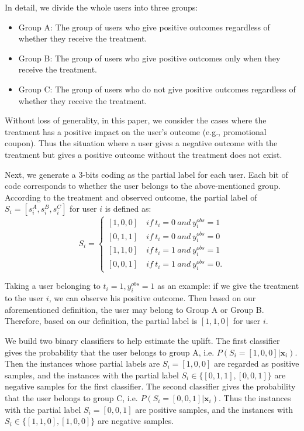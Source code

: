 In detail, we divide the whole users into three groups:
\begin{itemize}
	\item Group A: The group of users who give positive outcomes regardless of whether they receive the treatment.
	\item Group B: The group of users who give positive outcomes only when they receive the treatment.
	\item Group C: The group of users who do not give positive outcomes regardless of whether they receive the treatment.
\end{itemize}
Without loss of generality, in this paper, we consider the cases where the treatment has a positive impact on the user's outcome (e.g., promotional coupon). Thus the situation where a user gives a negative outcome with the treatment but gives a positive outcome without the treatment does not exist. 

Next, we generate a 3-bits coding as the partial label for each user. Each bit of code corresponds to whether the user belongs to the above-mentioned group. 
According to the treatment and observed outcome, the partial label of $S_i = [s_{i}^A, s_{i}^B, s_{i}^C]$ for user $i$ is defined as:
\begin{equation}
S_i =
\begin{cases}
[1, 0, 0]& \: if \: t_i=0 \: and \: y_i^{obs}=1\\
[0, 1, 1]& \: if \: t_i=0 \: and \: y_i^{obs}=0\\
[1, 1, 0]& \: if \: t_i=1\: and \: y_i^{obs}=1\\
[0, 0, 1]& \: if \: t_i=1\: and \: y_i^{obs}=0.
\end{cases}
\end{equation}

Taking a user belonging to $t_i=1, y_i^{obs}=1$ as an example: if we give the treatment to the user $i$, we can observe his positive outcome. Then based on our aforementioned definition, the user may belong to Group A or Group B. Therefore, based on our definition, the partial label is $[1, 1, 0]$ for user $i$. 

We build two binary classifiers to help estimate the uplift. The first classifier gives the probability that the user belongs to group A, i.e. $P(S_i=[1, 0, 0]|\mathbf{x}_i)$. Then the instances whose partial labels are $S_i = [1, 0, 0]$ are regarded as positive samples, and the instances with the partial label $S_i \in \{[0, 1, 1], [0, 0, 1]\}$ are negative samples for the first classifier. The second classifier gives the probability that the user belongs to group C, i.e. $P(S_i=[0, 0, 1]|\mathbf{x}_i)$. Thus the instances with the partial label $S_i = [0, 0, 1]$ are positive samples, and the instances with $S_i \in \{[1, 1, 0], [1, 0, 0]\}$ are negative samples. 

